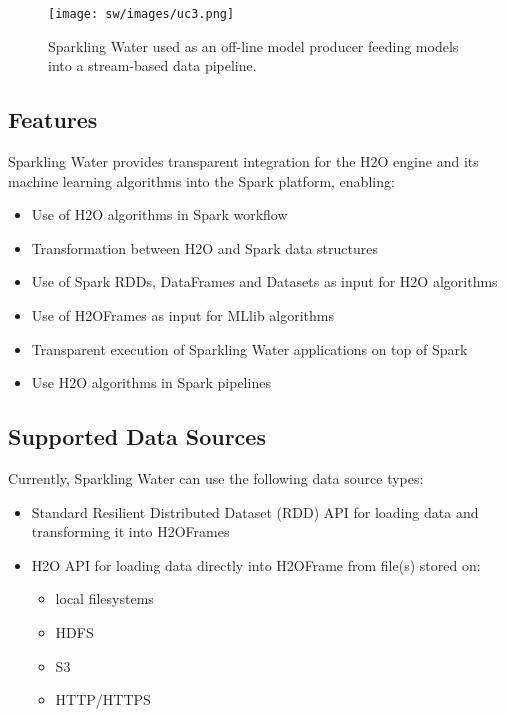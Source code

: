 \documentclass{standalone}
\begin{document}
\begin{figure}[h]
	\centering
	\texttt{[image: sw/images/uc3.png]}
	\caption{Sparkling Water used as an off-line model producer feeding models into a stream-based data pipeline.}
	\label{fig:uc3} 
\end{figure}

\subsection{Features}

Sparkling Water provides transparent integration for the H2O engine and its machine learning algorithms into the Spark platform, enabling:

\begin{itemize}

 \item Use of H2O algorithms in Spark workflow
 \item Transformation between H2O and Spark data structures
 \item Use of Spark RDDs, DataFrames and Datasets as input for H2O algorithms
 \item Use of H2OFrames as input for MLlib algorithms
 \item Transparent execution of Sparkling Water applications on top of Spark
 \item Use H2O algorithms in Spark pipelines
\end{itemize}

\subsection{Supported Data Sources}

Currently, Sparkling Water can use the following data source types:

\begin{itemize}

 \item Standard Resilient Distributed Dataset (RDD) API for loading data and transforming it into H2OFrames
 \item H2O API for loading data directly into H2OFrame from file(s) stored on:
  \begin{itemize}
    \item local filesystems
    \item HDFS
    \item S3
    \item HTTP/HTTPS
  \end{itemize}
\end{itemize}
\end{document}
